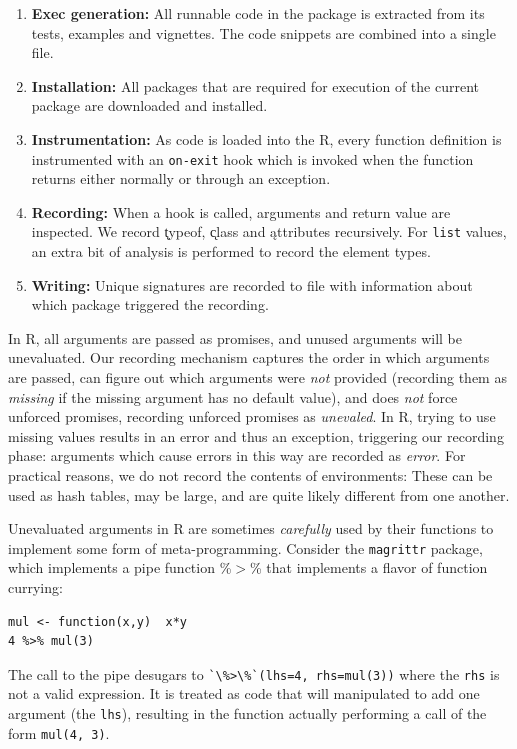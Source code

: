 \documentclass[acmsmall,10pt,review,anonymous]{acmart}\settopmatter{printfolios=true,printccs=false,printacmref=false}
\newcommand{\code}[1]{\lstinline|#1|\xspace}
\begin{document}
\begin{enumerate}
\item {\bf Exec generation:} All runnable code in the package is extracted
  from its tests, examples and vignettes. The code snippets are combined
  into a single file.
\item {\bf Installation:} All packages that are required for execution of
  the current package are downloaded and installed.
\item {\bf Instrumentation:} As code is loaded into the R, every function
  definition is instrumented with an \code{on-exit} hook which is invoked
  when the function returns either normally or through an exception.
\item {\bf Recording:} When a hook is called, arguments and return value are
  inspected. We record \k{typeof}, \k{class} and \k{attributes} recursively.
  For \code{list} values, an extra bit of analysis is performed to record
  the element types.
\item {\bf Writing:} Unique signatures are recorded to file with information
  about which package triggered the recording.
\end{enumerate}

In R, all arguments are passed as promises, and unused arguments will be unevaluated. 
Our recording mechanism captures the order in which arguments are passed, can figure out which arguments were {\it not} provided (recording them as {\it missing} if the missing argument has no default value), and does {\it not} force unforced promises, recording unforced promises as {\it unevaled}.
In R, trying to use missing values results in an error and thus an exception, triggering our recording phase: arguments which cause errors in this way are recorded as {\it error}.
For practical reasons, we do not record the contents of environments:
These can be used as hash tables, may be large, and are quite likely different from one another.

Unevaluated arguments in R are sometimes {\it carefully} used by their functions to implement some form of meta-programming.
Consider the {\tt magrittr} package, which implements a pipe function \%$>$\% that implements a flavor of function currying:

{\small\begin{lstlisting}[style=R]
mul <- function(x,y)  x*y
4 %>% mul(3)
\end{lstlisting}}

The call to the pipe desugars to \code{`\%>\%`(lhs=4, rhs=mul(3))} where the
\code{rhs} is not a valid expression. It is treated as code that will
manipulated to add one argument (the \code{lhs}), resulting in the function
actually performing a call of the form \code{mul(4, 3)}.
\end{document}
